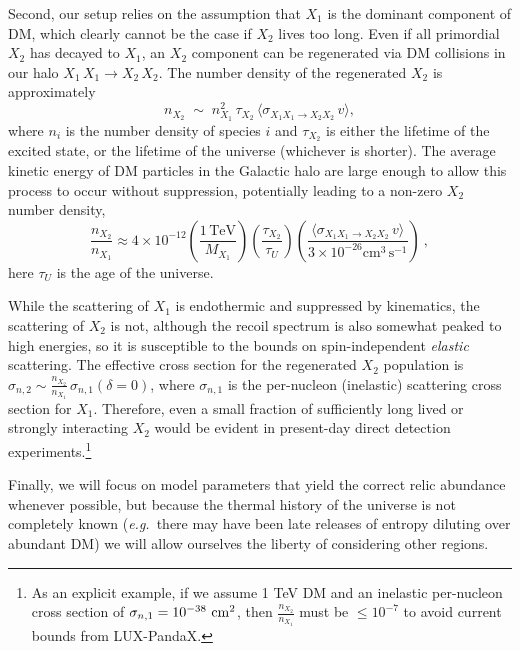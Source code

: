 \documentclass[11pt]{article}
\newcommand{\eg}{{\it e.g.}}
\begin{document}
Second, our setup relies on the assumption that $X_1$ is the dominant component of DM, which clearly cannot be the case if $X_2$ lives too long. Even if all primordial $X_2$ has decayed to $X_1$, an $X_2$ component can be regenerated via DM collisions in our halo $X_1\, X_1 \to X_2\, X_2$. The number density of the regenerated $X_2$ is approximately \cite{Batell:2009vb}
\begin{equation}
n_{X_2} \; \sim \; n^2_{X_1}\, \tau_{X_2}\, \langle \sigma_{X_1 X_1 \to X_2X_2}\, v \rangle,
\label{eq:n2frac}
\end{equation} 
where $n_i$ is the number density of species $i$ and $\tau_{X_2}$ is either the lifetime of the excited state, or the lifetime of the universe (whichever is shorter).  The average kinetic energy of DM particles in the Galactic halo are large enough to allow this process to occur without suppression, potentially leading to a non-zero $X_2$ number density,
\begin{equation}
\frac{n_{X_2}}{n_{X_1}} \approx 4\times 10^{-12} \left(\frac{1\,\mathrm{TeV}}{M_{X_1}}\right)   \left(\frac{\tau_{X_2}}{\tau_U}\right)   \left(\frac{\langle \sigma_{X_1 X_1 \to X_2X_2}\, v \rangle}{3\times10^{-26}\mathrm{cm}^3\,\mathrm{s}^{-1}}\right) ~,
\label{eq:n2fraction}
\end{equation} 
here $\tau_U$ is the age of the universe.

 
 While the scattering of $X_1$ is endothermic and suppressed by kinematics, the scattering of $X_2$ is not, although the recoil spectrum is also somewhat peaked to high energies, so it is susceptible to the bounds on spin-independent \emph{elastic} scattering. The effective cross section for the regenerated $X_2$ population is $\sigma_{n,2} \sim \frac{n_{X_2}}{n_{X_1}}\, \sigma_{n,1}(\delta=0)$, where $\sigma_{n,1}$ is the per-nucleon (inelastic) scattering cross section for $X_1$.  Therefore, even a small fraction of sufficiently long lived or strongly interacting $X_2$ would be evident  in present-day direct detection experiments.\footnote{As an explicit example, if we assume 1 TeV DM and an inelastic per-nucleon cross section of $\sigma_{n,1} = 10^{-38}~{\rm cm^2}$, then $\frac{n_{X_2}}{n_{X_1}} $ must be $\leq 10^{-7}$ to avoid current bounds from LUX-PandaX.}

Finally,  we will focus on model parameters that yield the correct relic abundance whenever possible, but because the thermal history of the universe is not completely known (\eg\ there may have been late releases of entropy diluting over abundant DM) we will allow ourselves the liberty of considering other regions.
\end{document}
